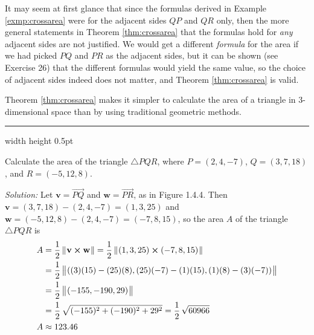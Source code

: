 It may seem at first glance that since the formulas derived in Example \ref{exmp:crossarea} were for the adjacent
sides $QP$ and $QR$ only, then the more general statements in Theorem \ref{thm:crossarea} that the formulas hold for
\emph{any} adjacent sides are not justified. We would get a different \emph{formula} for the area if we had
picked $PQ$ and $PR$ as the adjacent sides, but it can be shown (see Exercise 26) that the different formulas would
yield the same value, so the choice of adjacent sides indeed does not matter, and
Theorem \ref{thm:crossarea} is valid.

Theorem \ref{thm:crossarea} makes it simpler to calculate the area of a triangle in 3-dimensional space than by using
traditional geometric methods.

\vspace{4mm}
\hrule width \textwidth height 0.5pt
\begin{exmp}
 Calculate the area of the triangle $\triangle PQR$, where $P = (2,4,-7)$, $Q = (3,7,18)$, and
 $R =(-5,12,8)$.\vspace{1mm}
 \piccaption[]{}
 \par\noindent\emph{Solution:} Let $\textbf{v} = \overrightarrow{PQ}$ and $\textbf{w} = \overrightarrow{PR}$, as in
 Figure 1.4.4. Then $\textbf{v} = (3,7,18) - (2,4,-7) = (1,3,25)$ and $\textbf{w} = (-5,12,8) - (2,4,-7) = (-7,8,15)$,
 so the area $A$ of the triangle $\triangle PQR$ is
 \begin{align*}
 A &= \frac{1}{2}\,\lVert\mspace{1mu}\textbf{v} \bm{\times} \textbf{w}\mspace{1mu}\rVert = \frac{1}{2}\,\lVert\mspace{1mu}(1,3,25) \bm{\times} (-7,8,15)\mspace{1mu}\rVert\\
 &= \frac{1}{2}\,\bigl\lVert\mspace{1mu}((3)(15) - (25)(8), (25)(-7) - (1)(15), (1)(8) - (3)(-7))\mspace{1mu}\bigr\rVert\\
 &= \frac{1}{2}\,\bigl\lVert\mspace{1mu}(-155, -190, 29)\mspace{1mu}\bigr\rVert\\
 &= \frac{1}{2}\,\sqrt{(-155)^2 + (-190)^2 + 29^2} = \frac{1}{2}\,\sqrt{60966}\\
 A &\approx 123.46
 \end{align*}
 \end{exmp}
